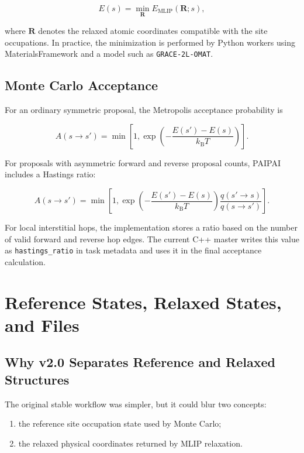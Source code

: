 \documentclass[11pt]{article}
\newcommand{\PAIPAI}{\textsc{PAIPAI}}
\newcommand{\kB}{k_{\mathrm{B}}}
\begin{document}
\begin{equation}
  E(s) = \min_{\mathbf{R}} E_{\mathrm{MLIP}}(\mathbf{R}; s),
\end{equation}

where $\mathbf{R}$ denotes the relaxed atomic coordinates compatible with the site occupations.
In practice, the minimization is performed by Python workers using MaterialsFramework and a model such as \texttt{GRACE-2L-OMAT}.

\subsection{Monte Carlo Acceptance}

For an ordinary symmetric proposal, the Metropolis acceptance probability is

\begin{equation}
  A(s \rightarrow s') =
  \min\left[
    1,
    \exp\left(-\frac{E(s') - E(s)}{\kB T}\right)
  \right].
\end{equation}

For proposals with asymmetric forward and reverse proposal counts, \PAIPAI{} includes a Hastings ratio:

\begin{equation}
  A(s \rightarrow s') =
  \min\left[
    1,
    \exp\left(-\frac{E(s') - E(s)}{\kB T}\right)
    \frac{q(s' \rightarrow s)}{q(s \rightarrow s')}
  \right].
\end{equation}

For local interstitial hops, the implementation stores a ratio based on the number of valid forward and reverse hop edges.
The current C++ master writes this value as \texttt{hastings\_ratio} in task metadata and uses it in the final acceptance calculation.

\section{Reference States, Relaxed States, and Files}

\subsection{Why v2.0 Separates Reference and Relaxed Structures}

The original stable workflow was simpler, but it could blur two concepts:

\begin{enumerate}
  \item the reference site occupation state used by Monte Carlo;
  \item the relaxed physical coordinates returned by MLIP relaxation.
\end{enumerate}
\end{document}
